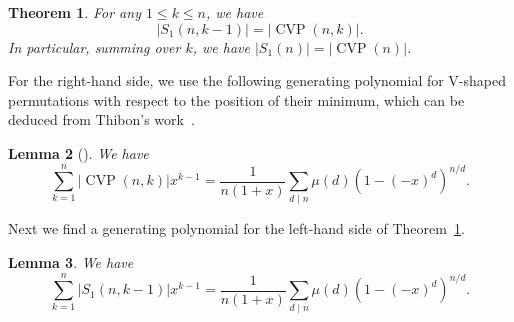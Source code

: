 \documentclass[12pt]{article}
\DeclareMathOperator{\CVP}{CVP}
\newcommand{\card}[1]{\left|#1\right|}
\newtheorem{theorem}{Theorem}[section]
\newtheorem{lemma}[theorem]{Lemma}
\theoremstyle{definition}
\begin{document}
\begin{theorem}\label{thm:S=CVP} For any $1\le k\le n$, we have
    $$\card{S_1(n, k-1)} = \card{\CVP(n, k)}.$$
In particular, summing over $k$, we have $\card{S_1(n)}=\card{\CVP(n)}$.
\end{theorem}

For the right-hand side, we use the following generating polynomial for V-shaped permutations with respect to the position of their minimum, which can be deduced from Thibon's work~\cite{Thibon}.

\begin{lemma}[\cite{Thibon}] \label{lem:thibon}
We have
\[
    \sum_{k=1}^n\card{\CVP(n,k)}x^{k-1}=\frac{1}{n(1+x)}\sum_{d\mid n}\mu(d)\left(1-(-x)^d\right)^{n/d}.
\]
\end{lemma}

Next we find a generating polynomial for the left-hand side of
Theorem~\ref{thm:S=CVP}.

\begin{lemma}
    \label{lem:S1}
    We have
$$
 \sum_{k=1}^n\card{S_1(n,k-1)}x^{k-1}=\frac{1}{n(1+x)} \sum_{d \mid n} \mu(d) \left(1 - (-x)^d\right)^{n/d}.
  $$  
\end{lemma}
\end{document}
